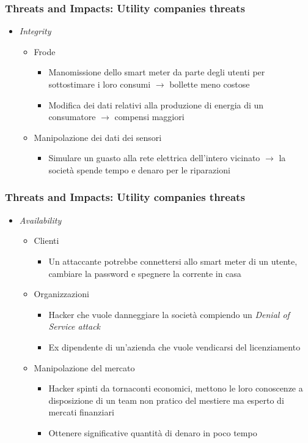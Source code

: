 \begin{frame}
  \frametitle{Threats and Impacts: Utility companies threats}
  \begin{itemize}[<+- | alert@+>]
  \item \textit{Integrity}
  \begin{itemize}
	  \item Frode
	  \begin{itemize}
	  \item Manomissione dello smart meter da parte degli utenti per sottostimare i loro consumi $\rightarrow$ bollette meno costose 
	  \item Modifica dei dati relativi alla produzione di energia di un consumatore $\rightarrow$ compensi maggiori
	  \end{itemize}
	\item Manipolazione dei dati dei sensori
		\begin{itemize}
		\item Simulare un guasto alla rete elettrica dell'intero vicinato $\rightarrow$ la società spende tempo e denaro per le riparazioni
		\end{itemize}
 	\end{itemize}
 \end{itemize}
\end{frame}

\begin{frame}
  \frametitle{Threats and Impacts: Utility companies threats}
  \begin{itemize}[<+- | alert@+>]
  \item \textit{Availability}
  \begin{itemize}
	  \item Clienti
	  \begin{itemize}
	  \item Un attaccante potrebbe connettersi allo smart meter di un utente, cambiare la password e spegnere la corrente in casa
	  \end{itemize}
	\item Organizzazioni
		\begin{itemize}
		\item Hacker che vuole danneggiare la società compiendo un \textit{Denial of Service attack}
		\item Ex dipendente di un'azienda che vuole vendicarsi del licenziamento
		\end{itemize}
	\item Manipolazione del mercato
		\begin{itemize}
		\item Hacker spinti da tornaconti economici, mettono le loro conoscenze a disposizione di un team non pratico del mestiere ma esperto di mercati finanziari 
		\item Ottenere significative quantità di denaro in poco tempo
		\end{itemize}
 	\end{itemize}
 \end{itemize}
\end{frame}
